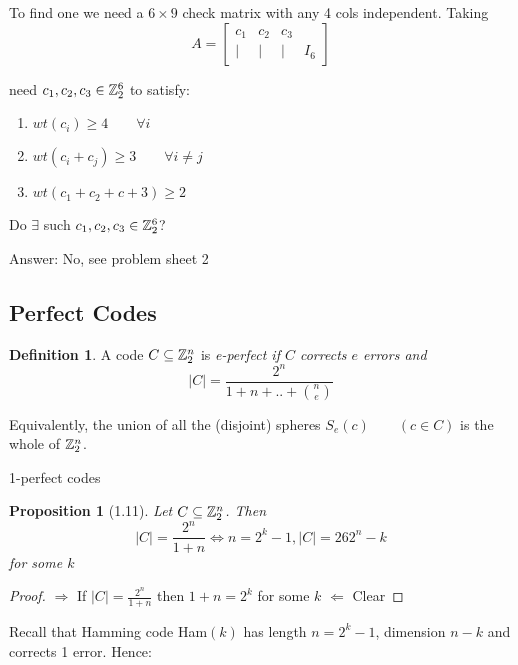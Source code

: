 \documentclass[]{article}
\newtheorem{prop}[thm]{Proposition}
\theoremstyle{definition}
\newtheorem*{defn}{Definition}
\theoremstyle{remark}
\numberwithin{equation}{section}
\begin{document}
			To find one we need a $6 \times 9$ check matrix with any 4 cols independent. \newline
			Taking \[
				A = \begin{bmatrix}
					c_1 & c_2 & c_3 \\
					| & | & | & I_6

				\end{bmatrix}
			\]

			need $c_1, c_2, c_3 \in \mathbb{Z}_2^6$ to satisfy: \newline

			\begin{enumerate}
				\item $wt(c_i)\geq 4 \qquad \forall i$
				\item $wt(c_i + c_j) \geq 3 \qquad \forall i\neq j$
				\item $wt(c_1 + c_2 + c+3) \geq 2$
			\end{enumerate}

			Do $\exists$ such $c_1, c_2, c_3 \in \mathbb{Z}_2^6$?

			Answer: No, see problem sheet 2
	\subsection{Perfect Codes}
		\begin{defn}
			A code $C \subseteq \mathbb{Z}_2^n$ is  \em{e-perfect} if $C$ corrects $e$ errors and \newline
			\[
			|C| = \frac{2^n}{1 + n + .. + {n \choose e}}
			\]

			Equivalently, the union of all the (disjoint) spheres $S_e(c)\qquad (c\in C)$ is the whole of $\mathbb{Z}_2^n$.
		\end{defn}

		1-perfect codes

		\begin{prop}[1.11]
			Let $C \subseteq \mathbb{Z}_2^n$. Then \newline
			\[
				|C| = \frac{2^n}{1+n} \iff n=2^k-1, |C| =26 2^n-k 
			\]
			for some $k$
		\end{prop}

		\begin{proof}
			
			$\Rightarrow$ \newline
			If $|C| = \frac{2^n}{1+n}$ then $1 +n = 2^k$ for some $k$ \newline
			$\Leftarrow$ Clear
		\end{proof}

		Recall that Hamming code Ham$(k)$ has length $n= 2^k-1$, dimension $n-k$ and corrects 1 error. Hence: \newline
\end{document}
